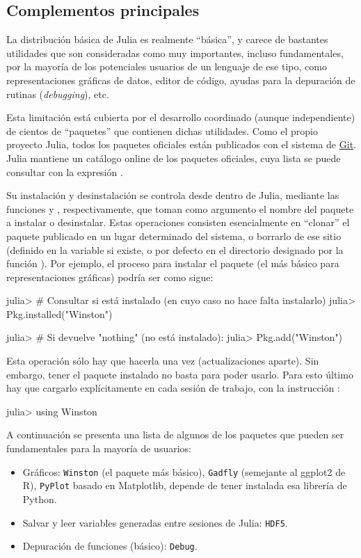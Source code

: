 ﻿\documentclass[spanish]{article}
\begin{document}
\subsection{Complementos principales}

La distribución básica de Julia es realmente ``básica'', y carece de bastantes utilidades que son consideradas como muy importantes, incluso fundamentales, por la mayoría de los potenciales usuarios de un lenguaje de ese tipo, como representaciones gráficas de datos, editor de código, ayudas para la depuración de rutinas (\emph{debugging}), etc.

Esta limitación está cubierta por el desarrollo coordinado (aunque independiente) de cientos de ``paquetes'' que contienen dichas utilidades. Como el propio proyecto Julia, todos los paquetes oficiales están publicados con el sistema de \href{http://git-scm.com/}{Git}. Julia mantiene un catálogo online de los paquetes oficiales, cuya lista se puede consultar con la expresión .

Su instalación y desinstalación se controla desde dentro de Julia, mediante las funciones  y , respectivamente, que toman como argumento el nombre del paquete a instalar o desinstalar. Estas operaciones consisten esencialmente en ``clonar'' el paquete publicado en un lugar determinado del sistema, o borrarlo de ese sitio (definido en la variable  si existe, o por defecto en el directorio designado por la función ). Por ejemplo, el proceso para instalar el paquete  (el más básico para representaciones gráficas) podría ser como sigue:

julia> # Consultar si está instalado (en cuyo caso no hace falta instalarlo)
julia> Pkg.installed("Winston")

julia> # Si devuelve "nothing" (no está instalado):
julia> Pkg.add("Winston")

Esta operación sólo hay que hacerla una vez (actualizaciones aparte). Sin embargo, tener el paquete instalado no basta para poder usarlo. Para esto último hay que cargarlo explícitamente en cada sesión de trabajo, con la instrucción :

julia> using Winston

A continuación se presenta una lista de algunos de los paquetes que pueden ser fundamentales para la mayoría de usuarios:

\begin{itemize}
  \item Gráficos: \texttt{Winston} (el paquete más básico), \texttt{Gadfly} (semejante al ggplot2 de R), \texttt{PyPlot} basado en Matplotlib, depende de tener instalada esa librería de Python.
  \item Salvar y leer variables generadas entre sesiones de Julia: \texttt{HDF5}.
  \item Depuración de funciones (básico): \texttt{Debug}.
\end{itemize}
\end{document}
